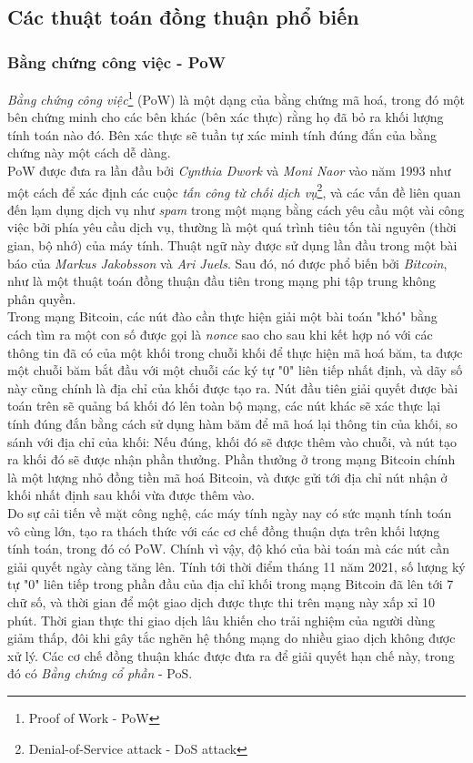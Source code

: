 \subsection{Các thuật toán đồng thuận phổ biến}

\subsubsection{Bằng chứng công việc - PoW}

\textit{Bằng chứng công việc}\footnote{Proof of Work - PoW} (PoW) là một dạng của bằng chứng mã hoá, trong đó một bên chứng minh cho các bên khác (bên xác thực) rằng họ đã bỏ ra khối lượng tính toán nào đó. Bên xác thực sẽ tuần tự xác minh tính đúng đắn của bằng chứng này một cách dễ dàng.\\

PoW được đưa ra lần đầu bởi \textit{Cynthia Dwork} và \textit{Moni Naor} vào năm 1993 như một cách để xác định các cuộc \textit{tấn công từ chối dịch vụ}\footnote{Denial-of-Service attack - DoS attack}, và các vấn đề liên quan đến lạm dụng dịch vụ như \textit{spam} trong một mạng bằng cách yêu cầu một vài công việc bởi phía yêu cầu dịch vụ, thường là một quá trình tiêu tốn tài nguyên (thời gian, bộ nhớ) của máy tính. Thuật ngữ này được sử dụng lần đầu trong một bài báo của \textit{Markus Jakobsson} và \textit{Ari Juels}. Sau đó, nó được phổ biến bởi \textit{Bitcoin}, như là một thuật toán đồng thuận đầu tiên trong mạng phi tập trung không phân quyền.\\

Trong mạng Bitcoin, các nút đào cần thực hiện giải một bài toán "khó" bằng cách tìm ra một con số được gọi là \textit{nonce} sao cho sau khi kết hợp nó với các thông tin đã có của một khối trong chuỗi khối để thực hiện mã hoá băm, ta được một chuỗi băm bắt đầu với một chuỗi các ký tự "0" liên tiếp nhất định, và dãy số này cũng chính là địa chỉ của khối được tạo ra. Nút đầu tiên giải quyết được bài toán trên sẽ quảng bá khối đó lên toàn bộ mạng, các nút khác sẽ xác thực lại tính đúng đắn bằng cách sử dụng hàm băm để mã hoá lại thông tin của khối, so sánh với địa chỉ của khối: Nếu đúng, khối đó sẽ được thêm vào chuỗi, và nút tạo ra khối đó sẽ được nhận phần thưởng. Phần thưởng ở trong mạng Bitcoin chính là một lượng nhỏ đồng tiền mã hoá Bitcoin, và được gửi tới địa chỉ nút nhận ở khối nhất định sau khối vừa được thêm vào.\\

Do sự cải tiến về mặt công nghệ, các máy tính ngày nay có sức mạnh tính toán vô cùng lớn, tạo ra thách thức với các cơ chế đồng thuận dựa trên khối lượng tính toán, trong đó có PoW. Chính vì vậy, độ khó của bài toán mà các nút cần giải quyết ngày càng tăng lên. Tính tới thời điểm tháng 11 năm 2021, số lượng ký tự "0" liên tiếp trong phần đầu của địa chỉ khối trong mạng Bitcoin đã lên tới 7 chữ số, và thời gian để một giao dịch được thực thi trên mạng này xấp xỉ 10 phút. Thời gian thực thi giao dịch lâu khiến cho trải nghiệm của người dùng giảm thấp, đôi khi gây tắc nghẽn hệ thống mạng do nhiều giao dịch không được xử lý. Các cơ chế đồng thuận khác được đưa ra để giải quyết hạn chế này, trong đó có \textit{Bằng chứng cổ phần} - PoS.

